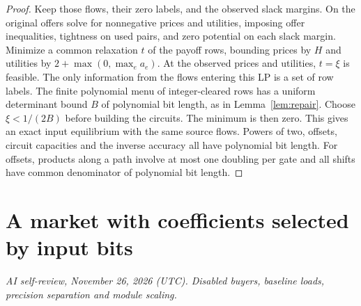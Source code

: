 \documentclass[11pt,oneside,openany,notitlepage]{report}
\newcommand{\reviewdate}{November 26, 2026 (UTC)}
\newcommand{\reviewmark}[1]{\par\nopagebreak[4]\noindent
  {\footnotesize\itshape AI self-review, \reviewdate. #1\par}\nobreak\smallskip}
\begin{document}
\begin{proof}
Keep those flows, their zero labels, and the observed slack margins.
On the original offers solve for nonnegative prices and utilities,
imposing offer inequalities, tightness on used pairs, and zero potential
on each slack margin. Minimize a common relaxation \(t\) of the payoff
rows, bounding prices by \(H\) and utilities by \(2+\max(0,\max_e a_e)\).
At the observed prices and utilities, \(t=\xi\) is feasible. The only
information from the flows entering this LP is a set of row labels.
The finite polynomial menu of integer-cleared rows has a uniform
determinant bound \(B\) of polynomial bit length, as in
Lemma~\ref{lem:repair}. Choose \(\xi<1/(2B)\) before building the circuits.
The minimum is then zero. This gives an exact input equilibrium with
the same source flows. Powers of two, offsets, circuit capacities and
the inverse accuracy all have polynomial bit length. For offsets, products
along a path involve at most one doubling per gate and all shifts have
common denominator of polynomial bit length.
\end{proof}

\section{A market with coefficients selected by input bits}
\reviewmark{Disabled buyers, baseline loads, precision separation and module scaling.}
\end{document}
